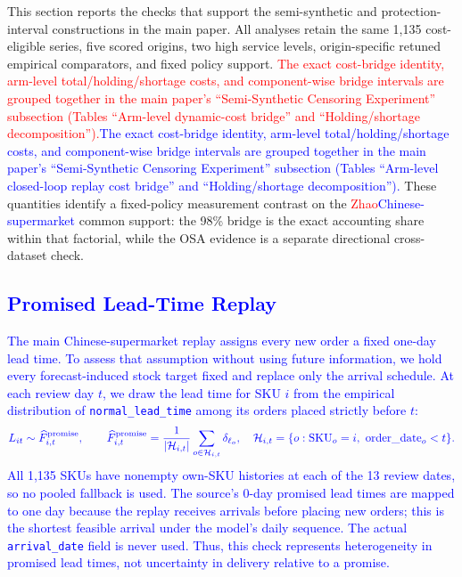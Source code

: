 \documentclass[msom,dblanonrev]{informs4}
\newcommand{\add}[1]{\textcolor{blue}{#1}}
\newcommand{\reduce}[1]{\textcolor{red}{#1}\hspace{0.5em}}
\begin{document}
This section reports the checks that support the semi-synthetic and protection-interval constructions in the main paper.
All analyses retain the same 1{,}135 cost-eligible series, five scored origins, two high service levels, origin-specific retuned empirical comparators, and fixed policy support.
\reduce{The exact cost-bridge identity, arm-level total/holding/shortage costs, and component-wise bridge intervals are grouped together in the main paper's ``Semi-Synthetic Censoring Experiment'' subsection (Tables ``Arm-level dynamic-cost bridge'' and ``Holding/shortage decomposition'').}\add{The exact cost-bridge identity, arm-level total/holding/shortage costs, and component-wise bridge intervals are grouped together in the main paper's ``Semi-Synthetic Censoring Experiment'' subsection (Tables ``Arm-level closed-loop replay cost bridge'' and ``Holding/shortage decomposition'').}
These quantities identify a fixed-policy measurement contrast on the \reduce{Zhao}\add{Chinese-supermarket} common support: the 98\% bridge is the exact accounting share within that factorial, while the OSA evidence is a separate directional cross-dataset check.

\subsection{\add{Promised Lead-Time Replay}}\label{oa:promised-lead-time}

\add{The main Chinese-supermarket replay assigns every new order a fixed one-day lead time. To assess that assumption without using future information, we hold every forecast-induced stock target fixed and replace only the arrival schedule. At each review day $t$, we draw the lead time for SKU $i$ from the empirical distribution of \texttt{normal\_lead\_time} among its orders placed strictly before $t$:}
\[
\add{L_{it}\sim\widehat F_{i,t}^{\mathrm{promise}},
\qquad
\widehat F_{i,t}^{\mathrm{promise}}
=\frac{1}{|\mathcal H_{i,t}|}
\sum_{o\in\mathcal H_{i,t}}\delta_{\ell_o},
\quad
\mathcal H_{i,t}=\{o:\mathrm{SKU}_o=i,\ \mathrm{order\_date}_o<t\}.}
\]
\add{All 1{,}135 SKUs have nonempty own-SKU histories at each of the 13 review dates, so no pooled fallback is used. The source's 0-day promised lead times are mapped to one day because the replay receives arrivals before placing new orders; this is the shortest feasible arrival under the model's daily sequence. The actual \texttt{arrival\_date} field is never used. Thus, this check represents heterogeneity in promised lead times, not uncertainty in delivery relative to a promise.}
\end{document}
